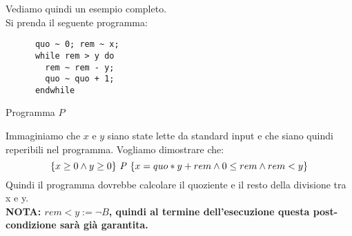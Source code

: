				      				\begin{esempio}
				      			Vediamo quindi un esempio completo.\\
				      			Si prenda il seguente programma:
				      			\begin{listing}[H]
				      				\begin{lstlisting}
      quo ~ 0; rem ~ x;
      while rem > y do
        rem ~ rem - y;
        quo ~ quo + 1;
      endwhile  
				      				\end{lstlisting}
				      				\caption{Programma $P$}
				      				\label{E:W}
				      			\end{listing}
				      			Immaginiamo che $x$ e $y$ siano state lette da standard input e che siano quindi reperibili nel programma. Vogliamo dimostrare che:
				      			\[\{x\geq 0 \land y\geq 0\}\mbox{ \textit{P} }\{x=quo*y + rem \land 0 \leq rem \land rem < y\}\]
				      			Quindi il programma dovrebbe calcolare il quoziente e il resto della divisione tra x e y. \\ \textbf{NOTA: $ rem < y := \neg B $, quindi al termine dell'esecuzione questa post-condizione sarà già garantita.}

\end{esempio}
